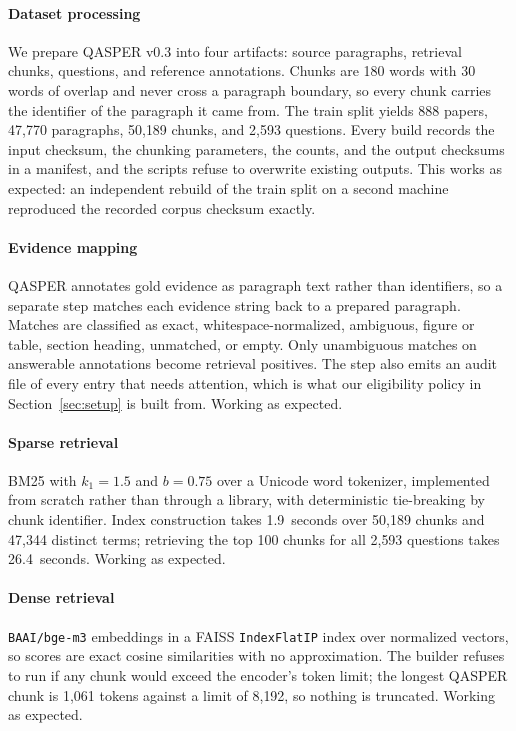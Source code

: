 \documentclass[sigconf,nonacm]{acmart}
\begin{document}
\paragraph{Dataset processing} We prepare QASPER v0.3 into four artifacts: source
paragraphs, retrieval chunks, questions, and reference annotations. Chunks are
180 words with 30 words of overlap and never cross a paragraph boundary, so every
chunk carries the identifier of the paragraph it came from. The train split
yields 888 papers, 47{,}770 paragraphs, 50{,}189 chunks, and 2{,}593 questions.
Every build records the input checksum, the chunking parameters, the counts, and
the output checksums in a manifest, and the scripts refuse to overwrite existing
outputs. This works as expected: an independent rebuild of the train split on a
second machine reproduced the recorded corpus checksum exactly.

\paragraph{Evidence mapping} QASPER annotates gold evidence as paragraph text
rather than identifiers, so a separate step matches each evidence string back to
a prepared paragraph. Matches are classified as exact, whitespace-normalized,
ambiguous, figure or table, section heading, unmatched, or empty. Only
unambiguous matches on answerable annotations become retrieval positives. The
step also emits an audit file of every entry that needs attention, which is what
our eligibility policy in Section~\ref{sec:setup} is built from. Working as
expected.

\paragraph{Sparse retrieval} BM25 with $k_1 = 1.5$ and $b = 0.75$ over a
Unicode word tokenizer, implemented from scratch rather than through a library,
with deterministic tie-breaking by chunk identifier. Index construction takes
1.9~seconds over 50{,}189 chunks and 47{,}344 distinct terms; retrieving the top
100 chunks for all 2{,}593 questions takes 26.4~seconds. Working as expected.

\paragraph{Dense retrieval} \texttt{BAAI/bge-m3} embeddings in a FAISS
\texttt{IndexFlatIP} index over normalized vectors, so scores are exact cosine
similarities with no approximation. The builder refuses to run if any chunk would
exceed the encoder's token limit; the longest QASPER chunk is 1{,}061 tokens
against a limit of 8{,}192, so nothing is truncated. Working as expected.
\end{document}
